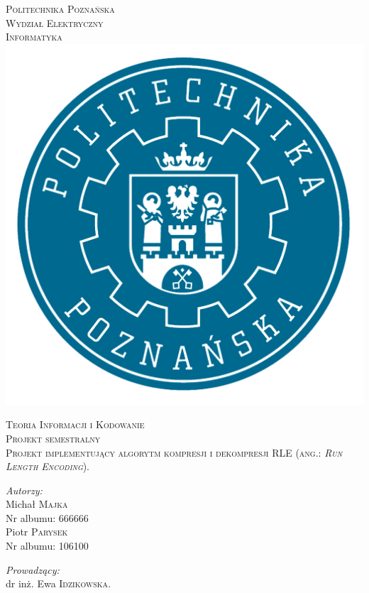 \documentclass[12pt,a4paper]{article}
\begin{document}
\renewcommand\tablename{Tabela} %

\begin{titlepage}
\begin{center}

\textsc{\LARGE Politechnika Poznańska}\\[0.2cm]
\textsc{\Large Wydział Elektryczny \\ Informatyka}\\[0.6cm]

\includegraphics[scale=0.8]{logopoli}
\vspace{.5cm}

\textsc{\large Teoria Informacji i Kodowanie}\\[0.2cm]
\textsc{\normalsize Projekt semestralny}\\[.2cm]
\textsc{\large Projekt implementujący algorytm kompresji i dekompresji RLE (ang.: \textit{Run Length Encoding}).}\\[.5cm]


\noindent
\begin{minipage}[t]{0.49\textwidth}
\begin{flushleft} \large
\emph{Autorzy:}\\
Michał \textsc{Majka} \\
Nr albumu: 666666 \\
Piotr \textsc{Parysek} \\
Nr albumu: 106100
\end{flushleft}
\end{minipage}%
\begin{minipage}[t]{0.49\textwidth}
\begin{flushright} \large
\emph{Prowadzący:} \\
dr inż. Ewa \textsc{Idzikowska}.
\end{flushright}
\end{minipage}


\end{center}
\end{titlepage}
\end{document}
